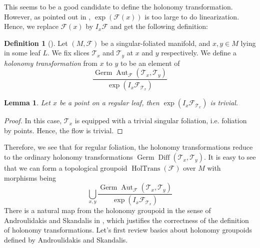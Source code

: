 \documentclass[12pt]{amsart}
\newtheorem{lem}[thm]{Lemma}
\theoremstyle{definition}
\newtheorem{defn}[thm]{Definition}
\theoremstyle{remark}
\numberwithin{equation}{section}
\newcommand{\CF}{{\mathcal F}}
\newcommand{\1}{{\mathbb{1}}}
\newcommand{\Diff}{\operatorname{Diff}}
\newcommand{\germ}{\operatorname{Germ}}
\newcommand{\aut}{\operatorname{Aut}}
\newcommand{\holtrans}{\operatorname{HolTrans}}
\begin{document}
This seems to be a good candidate to define the holonomy transformation. However, as pointed out in \cite{AZ12}, $\exp(\CF(x))$ is too large to do linearization. Hence, we replace $\CF(x)$ by $I_x \CF$ and get the following definition:
\begin{defn}[\cite{AZ12}]
    Let $(M, \CF)$ be a singular-foliated manifold, and $x, y \in M$ lying in some leaf $L$. We fix slices $\mathcal{T}_x$ and $\mathcal{T}_y$ at $x$ and $y$ respectively. We define a {\it holonomy transformation} from $x$ to $y$ to be an element of 
    \begin{equation}
        \frac{\germ \aut_{\CF}(\mathcal{T}_x, \mathcal{T}_y)}{\exp(I_x \CF_{\mathcal{T}_x})}
    \end{equation}
\end{defn}
\begin{lem}
    Let $x$ be a point on a regular leaf, then $\exp(I_x \CF_{\mathcal{T}_x})$ is trivial.
\end{lem}
\begin{proof}
    In this case, $\mathcal{T}_x$ is equipped with a trivial singular foliation, i.e. foliation by points. Hence, the flow is trivial.
\end{proof}
Therefore, we see that for regular foliation, the holonomy transformations reduce to the ordinary holonomy transformations $\germ \Diff(\mathcal{T}_x, \mathcal{T}_y)$. It is easy to see that we can form a topological groupoid $\holtrans(\CF)$ over $M$ with morphisms being
\begin{equation*}
   \bigcup_{x,y} \frac{\germ \aut_{\CF}(\mathcal{T}_x, \mathcal{T}_y)}{\exp(I_x \CF_{\mathcal{T}_x})}
\end{equation*}
There is a natural map from the holonomy groupoid in the sense of Androulidakis and Skandalis in \cite{AS06}, which justifies the correctness of the definition of holonomy transformations. Let's first review basics about holonomy groupoids defined by Androulidakis and Skandalis.
\end{document}
